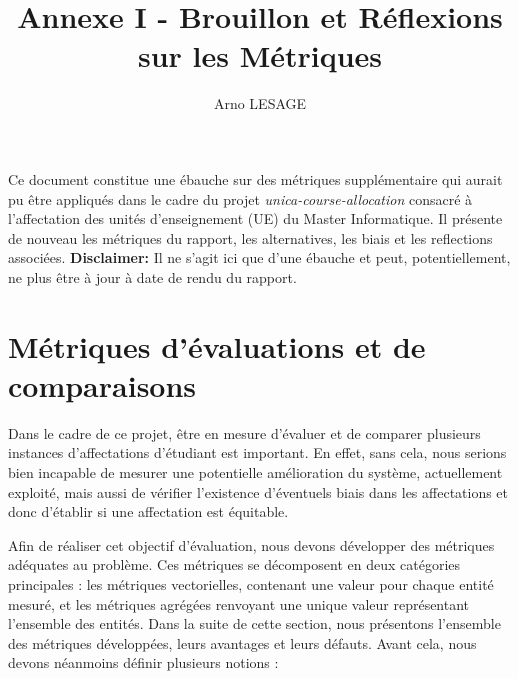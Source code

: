 \documentclass{rapport}
\title{Annexe I - Brouillon et Réflexions sur les Métriques}
\author{Arno LESAGE}
\date{}
\theoremstyle{definition}
\theoremstyle{remark}
\theoremstyle{definition}
\theoremstyle{remark}
\begin{document}
\maketitle


Ce document constitue une ébauche sur des métriques supplémentaire qui aurait pu être appliqués dans le cadre du projet \emph{unica-course-allocation} consacré à l'affectation des unités d'enseignement (UE) du Master Informatique. Il présente de nouveau les métriques du rapport, les alternatives, les biais et les reflections associées. \textbf{Disclaimer:} Il ne s'agit ici que d'une ébauche et peut, potentiellement, ne plus être à jour à date de rendu du rapport.

\section{Métriques d'évaluations et de comparaisons}

Dans le cadre de ce projet, être en mesure d'évaluer et de comparer plusieurs instances d'affectations d'étudiant est important.
En effet, sans cela, nous serions bien incapable de mesurer une potentielle amélioration du système, actuellement exploité, mais aussi de vérifier l'existence d'éventuels biais
dans les affectations et donc d'établir si une affectation est équitable.

Afin de réaliser cet objectif d'évaluation, nous devons développer des métriques adéquates au problème.
Ces métriques se décomposent en deux catégories principales : les métriques vectorielles, contenant une valeur pour chaque entité mesuré, et les métriques agrégées renvoyant une unique valeur représentant l'ensemble des entités.
Dans la suite de cette section, nous présentons l'ensemble des métriques développées, leurs avantages et leurs défauts.
Avant cela, nous devons néanmoins définir plusieurs notions :
\end{document}
